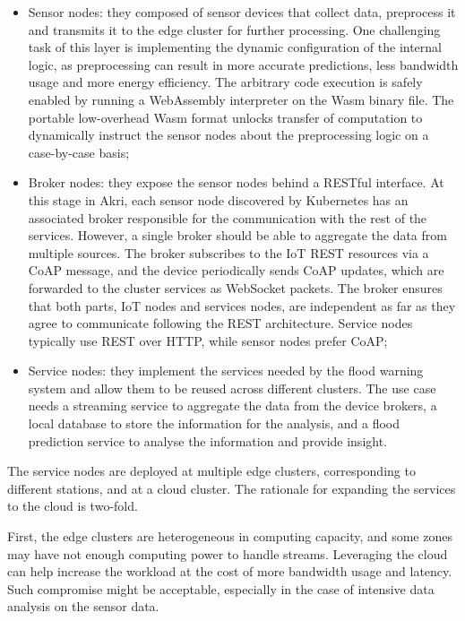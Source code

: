 \begin{itemize}
    \item Sensor nodes: they composed of sensor devices that collect data, preprocess it and transmits it to the edge cluster for further processing. One challenging task of this layer is implementing the dynamic configuration of the internal logic, as preprocessing can result in more accurate predictions, less bandwidth usage and more energy efficiency. The arbitrary code execution is safely enabled by running a WebAssembly interpreter on the Wasm binary file. The portable low-overhead Wasm format unlocks transfer of computation to dynamically instruct the sensor nodes about the preprocessing logic on a case-by-case basis;
    \item Broker nodes: they expose the sensor nodes behind a RESTful interface. At this stage in Akri, each sensor node discovered by Kubernetes has an associated broker responsible for the communication with the rest of the services. However, a single broker should be able to aggregate the data from multiple sources. The broker subscribes to the IoT REST resources via a CoAP message, and the device periodically sends CoAP updates, which are forwarded to the cluster services as WebSocket packets. The broker ensures that both parts, IoT nodes and services nodes, are independent as far as they agree to communicate following the REST architecture. Service nodes typically use REST over HTTP, while sensor nodes prefer CoAP;
    \item Service nodes: they implement the services needed by the flood warning system and allow them to be reused across different clusters. The use case needs a streaming service to aggregate the data from the device brokers, a local database to store the information for the analysis, and a flood prediction service to analyse the information and provide insight. 
\end{itemize}

The service nodes are deployed at multiple edge clusters, corresponding to different stations, and at a cloud cluster. The rationale for expanding the services to the cloud is two-fold.

First, the edge clusters are heterogeneous in computing capacity, and some zones may have not enough computing power to handle streams. Leveraging the cloud can help increase the workload at the cost of more bandwidth usage and latency. Such compromise might be acceptable, especially in the case of intensive data analysis on the sensor data.

